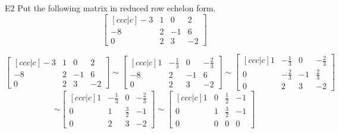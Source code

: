\begin{problem}{E2}
Put the following matrix in reduced row echelon form.
\[
  \begin{bmatrix}[ccc|c]
    -3 & 1 & 0 & 2 \\
    -8 & 2 & -1 & 6 \\
    0 & 2 & 3 & -2
  \end{bmatrix}
\]
\end{problem}
\begin{solution}
\[
  \begin{bmatrix}[ccc|c]
  -3 & 1 & 0 & 2 \\
   -8 & 2 & -1 & 6 \\
   0 & 2 & 3 & -2
  \end{bmatrix} \sim
  \begin{bmatrix}[ccc|c]
  1 & -\frac{1}{3} & 0 & -\frac{2}{3} \\
   -8 & 2 & -1 & 6 \\
   0 & 2 & 3 & -2
  \end{bmatrix} \sim
  \begin{bmatrix}[ccc|c]
  1 & -\frac{1}{3} & 0 & -\frac{2}{3} \\
   0 & -\frac{2}{3} & -1 & \frac{2}{3} \\
   0 & 2 & 3 & -2
  \end{bmatrix}
\]
\[
  \sim
  \begin{bmatrix}[ccc|c]
  1 & -\frac{1}{3} & 0 & -\frac{2}{3} \\
   0 & 1 & \frac{3}{2} & -1 \\
   0 & 2 & 3 & -2
  \end{bmatrix} \sim
  \begin{bmatrix}[ccc|c]
  1 & 0 & \frac{1}{2} & -1 \\
   0 & 1 & \frac{3}{2} & -1 \\
   0 & 0 & 0 & 0
  \end{bmatrix}
\]
\end{solution}

